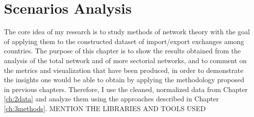 \chapter{Scenarios Analysis}




The core idea of my research is to study methods of network theory with the goal of applying them to the constructed dataset of import/export exchanges among countries. The purpose of this chapter is to show the results obtained from the analysis of the total network and of more sectorial networks, and to comment on the metrics and visualization that have been produced, in order to demonstrate the insights one would be able to obtain by applying the methodology proposed in previous chapters. Therefore, I use the cleaned, normalized data from Chapter \ref{ch:2data} and analyze them using the approaches described in Chapter \ref{ch:3methods}.
MENTION THE LIBRARIES AND TOOLS USED

